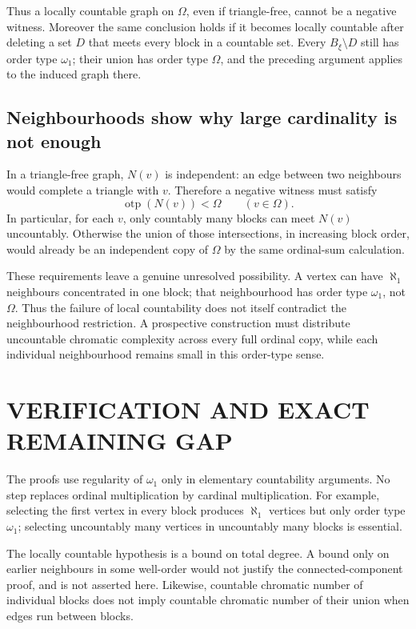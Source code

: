 Thus a locally countable graph on $\Omega$, even if triangle-free, cannot be a negative witness. Moreover the same conclusion holds if it becomes locally countable after deleting a set $D$ that meets every block in a countable set. Every $B_\xi\setminus D$ still has order type $\omega_1$; their union has order type $\Omega$, and the preceding argument applies to the induced graph there.

\subsection{Neighbourhoods show why large cardinality is not enough}
In a triangle-free graph, $N(v)$ is independent: an edge between two neighbours would complete a triangle with $v$. Therefore a negative witness must satisfy
\[
\operatorname{otp}(N(v))<\Omega\qquad(v\in\Omega).
\]
In particular, for each $v$, only countably many blocks can meet $N(v)$ uncountably. Otherwise the union of those intersections, in increasing block order, would already be an independent copy of $\Omega$ by the same ordinal-sum calculation.

These requirements leave a genuine unresolved possibility. A vertex can have $\aleph_1$ neighbours concentrated in one block; that neighbourhood has order type $\omega_1$, not $\Omega$. Thus the failure of local countability does not itself contradict the neighbourhood restriction. A prospective construction must distribute uncountable chromatic complexity across every full ordinal copy, while each individual neighbourhood remains small in this order-type sense.

\section{VERIFICATION AND EXACT REMAINING GAP}
The proofs use regularity of $\omega_1$ only in elementary countability arguments. No step replaces ordinal multiplication by cardinal multiplication. For example, selecting the first vertex in every block produces $\aleph_1$ vertices but only order type $\omega_1$; selecting uncountably many vertices in uncountably many blocks is essential.

The locally countable hypothesis is a bound on total degree. A bound only on earlier neighbours in some well-order would not justify the connected-component proof, and is not asserted here. Likewise, countable chromatic number of individual blocks does not imply countable chromatic number of their union when edges run between blocks.


